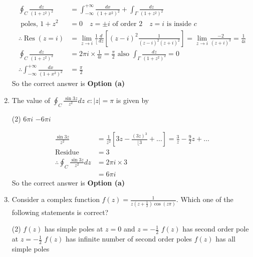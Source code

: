 \begin{enumerate}
\begin{answer}
	\begin{align*}
		\oint_{C} \frac{d z}{\left(1+z^{2}\right)^{2}}&=\int_{-\infty}^{+\infty} \frac{d x}{\left(1+x^{2}\right)^{2}}+\int_{\Gamma} \frac{d z}{\left(1+z^{2}\right)^{2}}\\
		\text{	poles, }1+z^{2}&=0 \quad z=\pm i\text{ of order $2 \quad z=i$ is inside } c\\
		\therefore \operatorname{Res}(z=i)&=\lim _{z \rightarrow i} \frac{1}{\lfloor} \frac{d}{d z}\left[(z-i)^{2} \frac{1}{(z-i)^{2}(z+i)^{2}}\right]=\lim _{z \rightarrow i} \frac{-2}{(z+i)^{3}}=\frac{1}{4 i}\\
		\oint_{C} \frac{d z}{\left(1+z^{2}\right)^{2}}&=2 \pi i \times \frac{1}{4 i}=\frac{\pi}{2}\text{ also }\int_{\Gamma} \frac{d z}{\left(1+z^{2}\right)^{2}}=0\\
		\therefore \int_{-\infty}^{+\infty} \frac{d x}{\left(1+x^{2}\right)^{2}}&=\frac{\pi}{2}
	\end{align*}
	So the correct answer is \textbf{Option (a)}
\end{answer}
\item The value of $\oint_{C} \frac{\sin 3 z}{z^{2}} d z$
$c:|z|=\pi$ is given by
\begin{tasks}(2)
	\task[\textbf{a.}]$6 \pi i$
	\task[\textbf{b.}]$-6 \pi i$
\end{tasks}
\begin{answer}
	\begin{align*}
		\frac{\sin 3 z}{z^{2}}&=\frac{1}{z^{2}}\left[3 z-\frac{(3 z)^{3}}{\lfloor 3}+\ldots\right]=\frac{3}{z}-\frac{9}{2} z+\ldots\\
		\text{Residue }&=3\\
		\therefore \oint_{C} \frac{\sin 3 z}{z^{2}} d z&=2 \pi i \times 3\\&=6 \pi i
	\end{align*}
	So the correct answer is \textbf{Option (a)}
\end{answer}
	\item Consider a complex function $f(z)=\frac{1}{z\left(z+\frac{1}{2}\right) \cos (z \pi)}$. Which one of the following
statements is correct?
\begin{tasks}(2)
	\task[\textbf{a.}] $f(z)$ has simple poles at $z=0$ and $z=-\frac{1}{2}$
	\task[\textbf{b.}]$f(z)$ has second order pole at $z=-\frac{1}{2}$
	\task[\textbf{c.}]$f(z)$ has infinite number of second order poles
	\task[\textbf{d.}] $f(z)$ has all simple poles
\end{tasks}

\end{enumerate}
